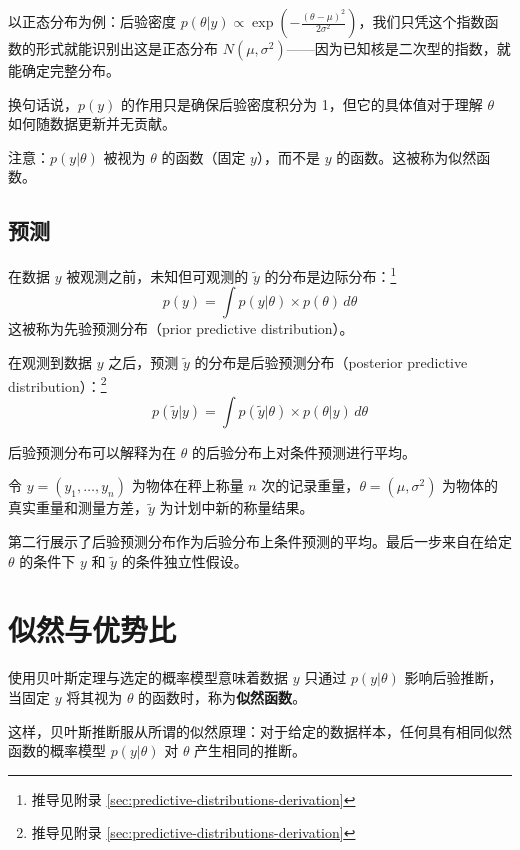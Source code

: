 以正态分布为例：后验密度 $p(\theta|y) \propto \exp\left(-\frac{(\theta-\mu)^2}{2\sigma^2}\right)$，我们只凭这个指数函数的形式就能识别出这是正态分布 $N(\mu, \sigma^2)$——因为已知核是二次型的指数，就能确定完整分布。

换句话说，$p(y)$ 的作用只是确保后验密度积分为 1，但它的具体值对于理解 $\theta$ 如何随数据更新并无贡献。

\begin{Remark}
  注意：$p(y|\theta)$ 被视为 $\theta$ 的函数（固定 $y$），而不是 $y$ 的函数。这被称为似然函数。
\end{Remark}

\subsection{预测}

在数据 $y$ 被观测之前，未知但可观测的 $\tilde{y}$ 的分布是边际分布：\footnote{推导见附录 \cref{sec:predictive-distributions-derivation}}
\[
p(y) = \int p(y|\theta) \times p(\theta) \, d\theta
\]
这被称为先验预测分布（prior predictive distribution）。

在观测到数据 $y$ 之后，预测 $\tilde{y}$ 的分布是后验预测分布（posterior predictive distribution）：\footnote{推导见附录 \cref{sec:predictive-distributions-derivation}}
\[
p(\tilde{y}|y) = \int p(\tilde{y}|\theta) \times p(\theta|y) \, d\theta
\]

后验预测分布可以解释为在 $\theta$ 的后验分布上对条件预测进行平均。

\begin{Example}[称重例子]
  令 $y = (y_1, \ldots, y_n)$ 为物体在秤上称量 $n$ 次的记录重量，$\theta = (\mu, \sigma^2)$ 为物体的真实重量和测量方差，$\tilde{y}$ 为计划中新的称量结果。

  第二行展示了后验预测分布作为后验分布上条件预测的平均。最后一步来自在给定 $\theta$ 的条件下 $y$ 和 $\tilde{y}$ 的条件独立性假设。
\end{Example}

\section{似然与优势比}

使用贝叶斯定理与选定的概率模型意味着数据 $y$ 只通过 $p(y|\theta)$ 影响后验推断，当固定 $y$ 将其视为 $\theta$ 的函数时，称为\textbf{似然函数}。

这样，贝叶斯推断服从所谓的似然原理：对于给定的数据样本，任何具有相同似然函数的概率模型 $p(y|\theta)$ 对 $\theta$ 产生相同的推断。

